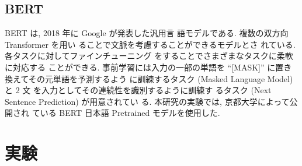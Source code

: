 \documentclass[twocolumn]{jarticle}     %
\begin{document}

\subsection{BERT}
BERT \cite{devlin2018bert} は, 2018 年に Google が発表した汎用言
語モデルである. 複数の双方向 Transformer を用い
ることで文脈を考慮することができるモデルとさ
れている. 各タスクに対してファインチューニング
をすることでさまざまなタスクに柔軟に対応する
ことができる. 事前学習には入力の一部の単語を
“[MASK]” に置き換えてその元単語を予測するよう
に訓練するタスク (Masked Language Model) と 2 文
を入力としてその連続性を識別するように訓練す
るタスク (Next Sentence Prediction) が用意されてい
る. 本研究の実験では, 京都大学によって公開され
ている BERT 日本語 Pretrained モデルを使用した.

\section{実験}
\end{document}
